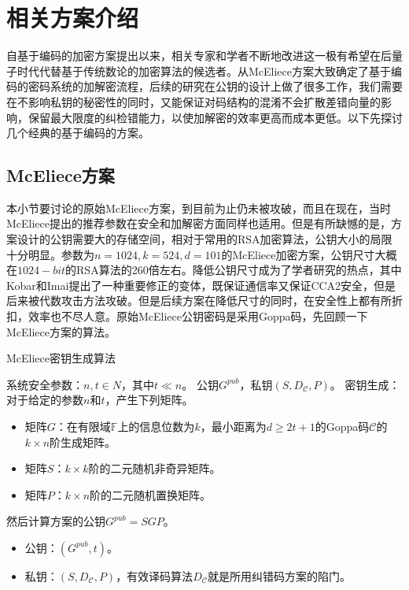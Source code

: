 \chapter{相关方案介绍}
\vspace{-0.2cm}
自基于编码的加密方案提出以来，相关专家和学者不断地改进这一极有希望在后量子时代代替基于传统数论的加密算法的候选者。从McEliece方案大致确定了基于编码的密码系统的加解密流程，后续的研究在公钥的设计上做了很多工作，我们需要在不影响私钥的秘密性的同时，又能保证对码结构的混淆不会扩散差错向量的影响，保留最大限度的纠检错能力，以使加解密的效率更高而成本更低。以下先探讨几个经典的基于编码的方案。

\section{McEliece方案}
本小节要讨论的原始McEliece方案，到目前为止仍未被攻破，而且在现在，当时McEliece提出的推荐参数在安全和加解密方面同样也适用。但是有所缺憾的是，方案设计的公钥需要大的存储空间，相对于常用的RSA加密算法，公钥大小的局限十分明显。参数为$n=1024,k=524,d=101$的McEliece加密方案，公钥尺寸大概在$1024-bit$的RSA算法的260倍左右。降低公钥尺寸成为了学者研究的热点，其中Kobar和Imai提出了一种重要修正的变体\cite{Misoczki2009Compact}，既保证通信率又保证CCA2安全，但是后来被代数攻击方法攻破\cite{Faug2010Algebraic, Faugere2013A, Moufek2017A}。但是后续方案在降低尺寸的同时，在安全性上都有所折扣，效率也不尽人意。原始McEliece公钥密码是采用Goppa码，先回顾一下McEliece方案的算法。

\begin{breakablealgorithm}
	\small
	\renewcommand{\algorithmicrequire}{\textbf{Input:}}
	\renewcommand{\algorithmicensure}{\textbf{Output:}}
	\caption{McEliece密钥生成算法}
	\label{alg:McElieceKeyGen}
	\begin{algorithmic}[1]
		\Require
		系统安全参数：$n,t \in N$，其中$t \ll n$。
		\Ensure
		公钥$G^{pub}$，私钥$(S,D_\mathcal{C},P)$。
		\State
		密钥生成：对于给定的参数$n$和$t$，产生下列矩阵。
		\begin{itemize}
			\item 矩阵$G$：在有限域$\mathbb{F}$上的信息位数为$k$，最小距离为$d \geq 2t + 1$的Goppa码$\mathcal{C}$的$k \times n$阶生成矩阵。
			\item 矩阵$S$：$k \times k$阶的二元随机非奇异矩阵。
			\item 矩阵$P$：$k \times n$阶的二元随机置换矩阵。
		\end{itemize}
		\State
		然后计算方案的公钥$G^{pub} = SGP$。
		\begin{itemize}
			\item 公钥：$(G^{pub},t)$。
			\item 私钥：$(S,D_\mathcal{C},P)$，有效译码算法$D_\mathcal{C}$就是所用纠错码方案的陷门。
		\end{itemize}
	\end{algorithmic}
\end{breakablealgorithm}


